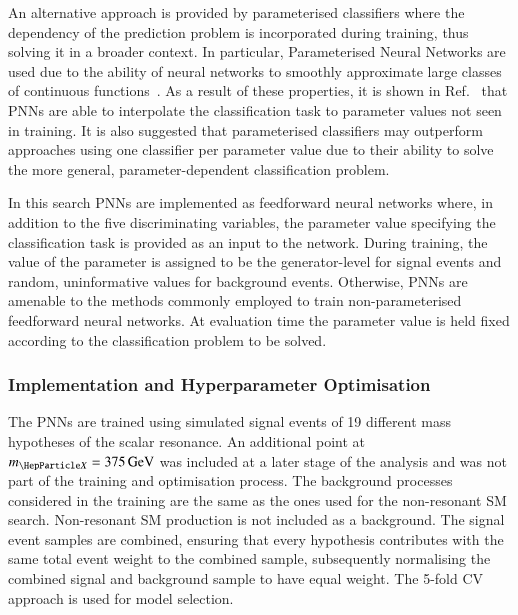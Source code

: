 An alternative approach is provided by parameterised classifiers where
the dependency of the prediction problem is incorporated during
training, thus solving it in a broader context. In particular,
Parameterised Neural Networks are used due to the ability of neural
networks to smoothly approximate large classes of continuous
functions~\cite{Baldi:2016fzo}. As a result of these properties, it is
shown in Ref.~\cite{Baldi:2016fzo} that PNNs are able to interpolate
the classification task to parameter values not seen in training. It
is also suggested that parameterised classifiers may outperform
approaches using one classifier per parameter value due to their
ability to solve the more general, parameter-dependent classification
problem.

In this search PNNs are implemented as feedforward neural networks
where, in addition to the five discriminating variables, the parameter
value specifying the classification task is provided as an input to
the network. During training, the value of the parameter is assigned
to be the generator-level \mX for signal events and random,
uninformative values for background events. Otherwise, PNNs are
amenable to the methods commonly employed to train non-parameterised
feedforward neural networks. At evaluation time the parameter value is
held fixed according to the classification problem to be solved.


\subsubsection{Implementation and Hyperparameter Optimisation}

The PNNs are trained using simulated signal events of 19 different
mass hypotheses of the scalar resonance. An additional point at
$\mX = \SI{375}{\GeV}$ was included at a later stage of the analysis
and was not part of the training and optimisation process. The
background processes considered in the training are the same as the
ones used for the non-resonant SM \HH search. Non-resonant SM \HH
production is not included as a background.
The signal event samples are combined, ensuring that every \mX
hypothesis contributes with the same total event weight to the
combined sample, subsequently normalising the combined signal and
background sample to have equal weight. The 5-fold CV approach is used
for model selection.

